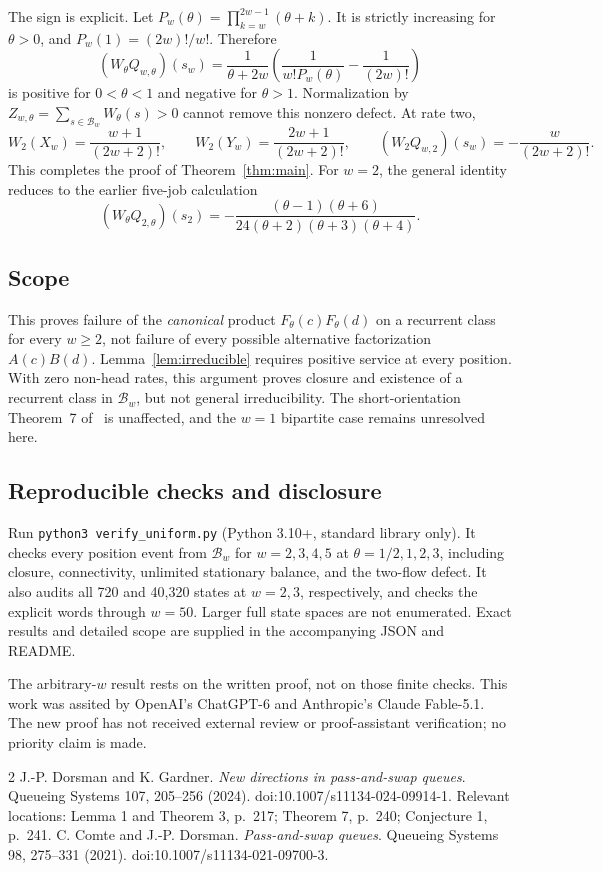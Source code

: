 \documentclass[11pt]{article}
\newcommand{\B}{\mathcal B_w}
\newcommand{\Qw}{Q_{w,\theta}}
\newcommand{\W}{W_\theta}
\newcommand{\F}{F_\theta}
\begin{document}
The sign is explicit. Let $P_w(\theta)=\prod_{k=w}^{2w-1}(\theta+k)$. It is strictly increasing for $\theta>0$, and $P_w(1)=(2w)!/w!$. Therefore
\[
 (\W\Qw)(s_w)=\frac{1}{\theta+2w}
 \left(\frac{1}{w!P_w(\theta)}-\frac{1}{(2w)!}\right)
\]
is positive for $0<\theta<1$ and negative for $\theta>1$. Normalization by
$Z_{w,\theta}=\sum_{s\in\B}\W(s)>0$ cannot remove this nonzero defect. At rate two,
\[
 W_2(X_w)=\frac{w+1}{(2w+2)!},\qquad
 W_2(Y_w)=\frac{2w+1}{(2w+2)!},\qquad
 \boxed{(W_2Q_{w,2})(s_w)=-\frac{w}{(2w+2)!}.}
\]
This completes the proof of Theorem~\ref{thm:main}. For $w=2$, the general identity reduces to the earlier five-job calculation
\[
 (\W Q_{2,\theta})(s_2)=
 -\frac{(\theta-1)(\theta+6)}{24(\theta+2)(\theta+3)(\theta+4)}.
\]

\subsection*{Scope}
This proves failure of the \emph{canonical} product $\F(c)\F(d)$ on a recurrent class for every $w\ge2$, not failure of every possible alternative factorization $A(c)B(d)$. Lemma~\ref{lem:irreducible} requires positive service at every position. With zero non-head rates, this argument proves closure and existence of a recurrent class in $\B$, but not general irreducibility. The short-orientation Theorem~7 of~\cite{DG} is unaffected, and the $w=1$ bipartite case remains unresolved here.

\subsection*{Reproducible checks and disclosure}
Run \texttt{python3 verify\_uniform.py} (Python 3.10+, standard library only). It checks every position event from $\B$ for $w=2,3,4,5$ at $\theta=1/2,1,2,3$, including closure, connectivity, unlimited stationary balance, and the two-flow defect. It also audits all 720 and 40,320 states at $w=2,3$, respectively, and checks the explicit words through $w=50$. Larger full state spaces are not enumerated. Exact results and detailed scope are supplied in the accompanying JSON and README.

The arbitrary-$w$ result rests on the written proof, not on those finite checks. This work was assited by OpenAI's ChatGPT-6 and Anthropic's Claude Fable-5.1. The new proof has not received external review or proof-assistant verification; no priority claim is made.

\begingroup\small
\begin{thebibliography}{2}
\setlength{\itemsep}{0pt}
 J.-P. Dorsman and K. Gardner. \textit{New directions in pass-and-swap queues}. Queueing Systems 107, 205--256 (2024). doi:10.1007/s11134-024-09914-1. Relevant locations: Lemma 1 and Theorem 3, p.\ 217; Theorem 7, p.\ 240; Conjecture 1, p.\ 241.
 C. Comte and J.-P. Dorsman. \textit{Pass-and-swap queues}. Queueing Systems 98, 275--331 (2021). doi:10.1007/s11134-021-09700-3.
\end{thebibliography}
\endgroup
\end{document}
